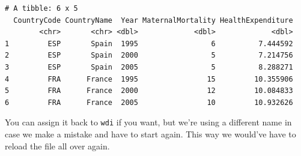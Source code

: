 \documentclass[]{article}
\newenvironment{Shaded}{\begin{snugshade}}{\end{snugshade}}
\newcommand{\KeywordTok}[1]{\textcolor[rgb]{0.13,0.29,0.53}{\textbf{{#1}}}}
\newcommand{\DataTypeTok}[1]{\textcolor[rgb]{0.13,0.29,0.53}{{#1}}}
\newcommand{\DecValTok}[1]{\textcolor[rgb]{0.00,0.00,0.81}{{#1}}}
\newcommand{\StringTok}[1]{\textcolor[rgb]{0.31,0.60,0.02}{{#1}}}
\newcommand{\NormalTok}[1]{{#1}}
\theoremstyle{definition}
\theoremstyle{definition}
\theoremstyle{definition}
\theoremstyle{remark}
\begin{document}
\begin{Shaded}
\end{Shaded}

\begin{verbatim}
# A tibble: 6 x 5
  CountryCode CountryName  Year MaternalMortality HealthExpenditure
        <chr>       <chr> <dbl>             <dbl>             <dbl>
1         ESP       Spain  1995                 6          7.444592
2         ESP       Spain  2000                 5          7.214756
3         ESP       Spain  2005                 5          8.288271
4         FRA      France  1995                15         10.355906
5         FRA      France  2000                12         10.084833
6         FRA      France  2005                10         10.932626
\end{verbatim}

You can assign it back to \texttt{wdi} if you want, but we're using a
different name in case we make a mistake and have to start again. This
way we would've have to reload the file all over again.
\end{document}
